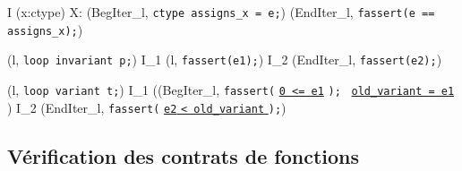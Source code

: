{\scriptsize
  {
    {
       {
        I \concat
        \forall (x:ctype) \not \in X:
        (BegIter_l, \mbox{\lstinline'ctype assigns_x = e;'})
        \concat (EndIter_l, \mbox{\lstinline'fassert(e == assigns_x);'})
      }
    }
  }
}

{\scriptsize
  {
    {
      (l, \mbox{\lstinline'loop invariant p;'}) 
      I_1 \concat (l, \mbox{\lstinline'fassert(e1);'})
      \concat I_2 \concat (EndIter_l, \mbox{\lstinline'fassert(e2);'})
    }
  }
}

{\scriptsize
  {
    {
      \splitfrac
          {
            (l, \mbox{\lstinline'loop variant t;'}) 
          }
          {
            I_1 \concat ((BegIter_l,
            \mbox{\lstinline'fassert('}
            \underline{\mbox{\lstinline'0 <= e1'}}
            \mbox{\lstinline');' }
            \underline{\Zinit \mbox{\lstinline'old_variant = e1'} \Zclear}
            \semicolon)
            \concat I_2
            \concat(EndIter_l,
            \mbox{\lstinline'fassert('}
            \underline{\mbox{\lstinline'e2'}\Zclear
              \mbox{\lstinline'< old_variant'} \Zclear}
            \mbox{\lstinline');'})
          }
    }
  }
}


\subsection{Vérification des contrats de fonctions}

